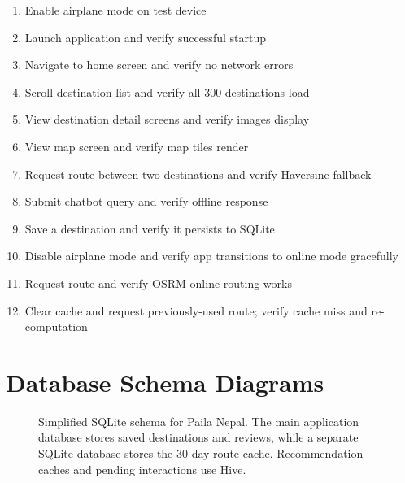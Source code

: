 \documentclass[12pt,a4paper,oneside]{report}
\begin{document}
\begin{enumerate}
\item Enable airplane mode on test device
\item Launch application and verify successful startup
\item Navigate to home screen and verify no network errors
\item Scroll destination list and verify all 300 destinations load
\item View destination detail screens and verify images display
\item View map screen and verify map tiles render
\item Request route between two destinations and verify Haversine fallback
\item Submit chatbot query and verify offline response
\item Save a destination and verify it persists to SQLite
\item Disable airplane mode and verify app transitions to online mode gracefully
\item Request route and verify OSRM online routing works
\item Clear cache and request previously-used route; verify cache miss and re-computation
\end{enumerate}

\chapter{Database Schema Diagrams}
\label{app:schema}

\begin{figure}[h]
\centering
{}
\caption{Simplified SQLite schema for Paila Nepal. The main application database stores saved destinations and reviews, while a separate SQLite database stores the 30-day route cache. Recommendation caches and pending interactions use Hive.}
\label{fig:db_schema}
\end{figure}
\end{document}
